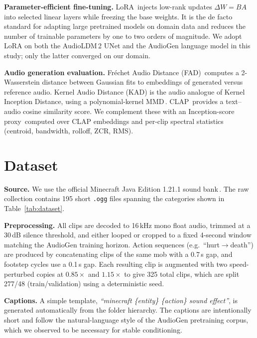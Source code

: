 \documentclass[conference]{IEEEtran}
\begin{document}
\textbf{Parameter-efficient fine-tuning.}
LoRA\,\cite{hu2022lora} injects low-rank updates $\Delta W = BA$ into
selected linear layers while freezing the base weights. It is the de
facto standard for adapting large pretrained models on domain data and
reduces the number of trainable parameters by one to two orders of
magnitude. We adopt LoRA on both the AudioLDM\,2 UNet and the AudioGen
language model in this study; only the latter converged on our domain.

\textbf{Audio generation evaluation.}
Fr{\'e}chet Audio Distance (FAD)\,\cite{kilgour2019fad} computes a
2-Wasserstein distance between Gaussian fits to embeddings of generated
versus reference audio. Kernel Audio Distance (KAD) is the audio analogue
of Kernel Inception Distance, using a polynomial-kernel
MMD\,\cite{gretton2012kernel}. CLAP\,\cite{wu2023clap} provides a
text--audio cosine similarity score. We complement these with an
Inception-score proxy\,\cite{salimans2016improved} computed over CLAP
embeddings and per-clip spectral statistics (centroid, bandwidth, rolloff,
ZCR, RMS).

\section{Dataset}

\textbf{Source.} We use the official Minecraft Java Edition 1.21.1 sound
bank\,\cite{minecraftassets}. The raw collection contains 195 short
\texttt{.ogg} files spanning the categories shown in
Table~\ref{tab:dataset}.

\textbf{Preprocessing.} All clips are decoded to 16\,kHz mono float
audio, trimmed at a 30\,dB silence threshold, and either looped or
cropped to a fixed 4-second window matching the AudioGen training
horizon. Action sequences (e.g.\ ``hurt$\to$death'') are produced by
concatenating clips of the same mob with a 0.7\,s gap, and footstep
cycles use a 0.1\,s gap. Each resulting clip is augmented with two
speed-perturbed copies at $0.85\times$ and $1.15\times$ to give 325
total clips, which are split 277/48 (train/validation) using a
deterministic seed.

\textbf{Captions.} A simple template,
\textit{``minecraft \{entity\} \{action\} sound effect''}, is generated
automatically from the folder hierarchy. The captions are intentionally
short and follow the natural-language style of the AudioGen pretraining
corpus, which we observed to be necessary for stable conditioning.
\end{document}
